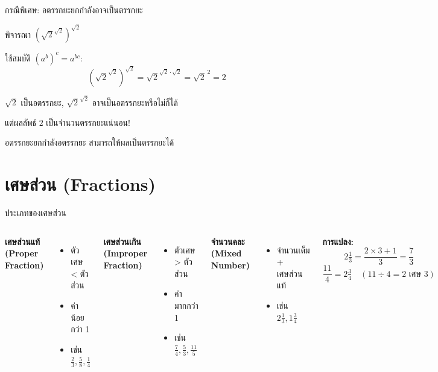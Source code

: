 \documentclass[11pt, aspectratio=169]{beamer}
\begin{document}
\begin{frame}{กรณีพิเศษ: อตรรกยะยกกำลังอาจเป็นตรรกยะ}
  \begin{exambox}
    พิจารณา $(\sqrt{2}^{\sqrt{2}})^{\sqrt{2}}$

    \medskip
    ใช้สมบัติ $(a^b)^c = a^{bc}$:
    \[
      (\sqrt{2}^{\sqrt{2}})^{\sqrt{2}} = \sqrt{2}^{\sqrt{2} \cdot \sqrt{2}} = \sqrt{2}^{\,2} = 2
    \]

    \medskip
    $\sqrt{2}$ เป็นอตรรกยะ, $\sqrt{2}^{\sqrt{2}}$ อาจเป็นอตรรกยะหรือไม่ก็ได้

    แต่ผลลัพธ์ $2$ เป็นจำนวนตรรกยะแน่นอน!

    \medskip
     อตรรกยะยกกำลังอตรรกยะ สามารถให้ผลเป็นตรรกยะได้
  \end{exambox}
\end{frame}

\section{เศษส่วน (Fractions)}

\begin{frame}{ประเภทของเศษส่วน}
  \begin{columns}[T]
      \textbf{เศษส่วนแท้ (Proper Fraction)}
      \begin{itemize}
        \item ตัวเศษ < ตัวส่วน
        \item ค่าน้อยกว่า 1
        \item เช่น $\frac{2}{3}, \frac{5}{8}, \frac{1}{4}$
      \end{itemize}

      \medskip
      \textbf{เศษส่วนเกิน (Improper Fraction)}
      \begin{itemize}
        \item ตัวเศษ > ตัวส่วน
        \item ค่ามากกว่า 1
        \item เช่น $\frac{7}{4}, \frac{5}{3}, \frac{11}{5}$
      \end{itemize}

      \textbf{จำนวนคละ (Mixed Number)}
      \begin{itemize}
        \item จำนวนเต็ม + เศษส่วนแท้
        \item เช่น $2\frac{1}{3}, 1\frac{3}{4}$
      \end{itemize}

      \medskip
      \textbf{การแปลง:}
      \[
        2\tfrac{1}{3} = \frac{2 \times 3 + 1}{3} = \frac{7}{3}
      \]
      \[
        \frac{11}{4} = 2\tfrac{3}{4} \quad (11 \div 4 = 2 \text{ เศษ } 3)
      \]
  \end{columns}
\end{frame}
\end{document}

